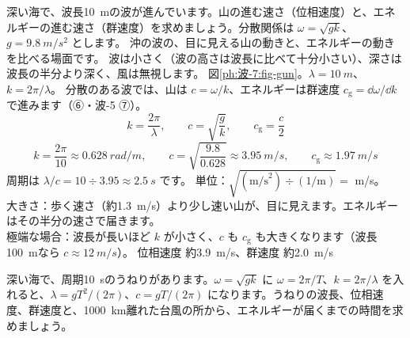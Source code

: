 \label{ph:波-7:ex8}
\begin{phreidai}
深い海で、波長\qty{10}{m}の波が進んでいます。山の進む速さ（位相速度）と、エネルギーの進む速さ（群速度）を求めましょう。分散関係は $\omega=\sqrt{gk}$、$g=\qty{9.8}{m/s^2}$ とします。
\phbamen
沖の波の、目に見える山の動きと、エネルギーの動きを比べる場面です。
\phmushi
波は小さく（波の高さは波長に比べて十分小さい）、深さは波長の半分より深く、風は無視します。
\phzu
図\ref{ph:波-7:fig-gun}。$\lambda=\qty{10}{m}$、$k=2\pi/\lambda$。
\phriyu
分散のある波では、山は $c=\omega/k$、エネルギーは群速度 $c_{\mathrm g}=\dd\omega/\dd k$ で進みます（⑥・波-5 ⑦）。
\phtateru
\[k=\frac{2\pi}{\lambda},\qquad c=\sqrt{\frac{g}{k}},\qquad c_{\mathrm g}=\frac{c}{2}\]
\phtoku
\[k=\frac{2\pi}{10}\approx\qty{0.628}{rad/m},\qquad c=\sqrt{\frac{9.8}{0.628}}\approx\qty{3.95}{m/s},\qquad c_{\mathrm g}\approx\qty{1.97}{m/s}\]
周期は $\lambda/c=10\div3.95\approx\qty{2.5}{s}$ です。
\phtashikame
単位：$\sqrt{(\text{m/s}^2)\div(\text{1/m})}=$ m/s。\\
大きさ：歩く速さ（約\qty{1.3}{m/s}）より少し速い山が、目に見えます。エネルギーはその半分の速さで届きます。\\
極端な場合：波長が長いほど $k$ が小さく、$c$ も $c_{\mathrm g}$ も大きくなります（波長\qty{100}{m}なら $c\approx\qty{12}{m/s}$）。
\kotae 位相速度 約\qty{3.9}{m/s}、群速度 約\qty{2.0}{m/s}
\end{phreidai}
\begin{jibun}
深い海で、周期\qty{10}{s}のうねりがあります。$\omega=\sqrt{gk}$ に $\omega=2\pi/T$、$k=2\pi/\lambda$ を入れると、$\lambda=gT^2/(2\pi)$、$c=gT/(2\pi)$ になります。うねりの波長、位相速度、群速度と、\qty{1000}{km}離れた台風の所から、エネルギーが届くまでの時間を求めましょう。
\end{jibun}

